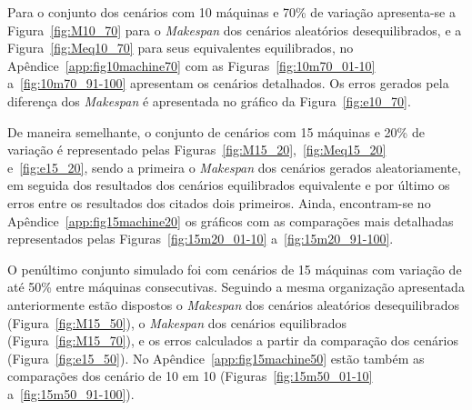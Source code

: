     
    
    
    
    
    
    Para o conjunto dos cenários com 10 máquinas e 70\% de variação apresenta-se a Figura~\ref{fig:M10_70} para o \textit{Makespan} dos cenários aleatórios desequilibrados, e a Figura~\ref{fig:Meq10_70} para seus equivalentes equilibrados, no Apêndice~\ref{app:fig10machine70} com as Figuras~\ref{fig:10m70_01-10} a~\ref{fig:10m70_91-100} apresentam os cenários detalhados. Os erros gerados pela diferença dos \textit{Makespan} é apresentada no gráfico da Figura~\ref{fig:e10_70}.
    
    
    
    
    
    
    
    De maneira semelhante, o conjunto de cenários com 15 máquinas e 20\% de variação é representado pelas Figuras~\ref{fig:M15_20},~\ref{fig:Meq15_20} e~\ref{fig:e15_20}, sendo a primeira o \textit{Makespan} dos cenários gerados aleatoriamente, em seguida dos resultados dos cenários equilibrados equivalente e por último os erros entre os resultados dos citados dois primeiros. Ainda, encontram-se no Apêndice~\ref{app:fig15machine20} os gráficos com as comparações mais detalhadas representados pelas Figuras~\ref{fig:15m20_01-10} a~\ref{fig:15m20_91-100}.
    
    
    
    
    
    
    
    O penúltimo conjunto simulado foi com cenários de 15 máquinas com variação de até 50\% entre máquinas consecutivas. Seguindo a mesma organização apresentada anteriormente estão dispostos o \textit{Makespan} dos cenários aleatórios desequilibrados (Figura~\ref{fig:M15_50}), o \textit{Makespan} dos cenários equilibrados (Figura~\ref{fig:M15_70}), e os erros calculados a partir da comparação dos cenários (Figura~\ref{fig:e15_50}). No Apêndice~\ref{app:fig15machine50} estão também as comparações dos cenário de 10 em 10 (Figuras~\ref{fig:15m50_01-10} a~\ref{fig:15m50_91-100}).
    
